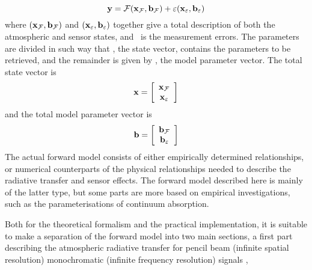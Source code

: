  \begin{equation}
   \mathbf{y} = \mathcal{F}(\mathbf{x}_{\mathcal{F}},\mathbf{b}_{\mathcal{F}}) + \varepsilon(\mathbf{x}_{\varepsilon},\mathbf{b}_{\varepsilon})
  \label{eq:formalism:fm}
 \end{equation}
 where $(\mathbf{x}_{\mathcal{F}},\mathbf{b}_{\mathcal{F}})$ and $(\mathbf{x}_{\varepsilon},\mathbf{b}_{\varepsilon})$ together give a
 total description of both the atmospheric and sensor states, and
 \merr\ is the measurement errors. The parameters are divided in such
 way that \xt, the state vector, contains the parameters to be
 retrieved, and the remainder is given by \bt, the model parameter
 vector. The total state vector is
 \begin{equation}
   \mathbf{x} = \left[ \begin{array}{c} \mathbf{x}_{\mathcal{F}} \\ \mathbf{x}_{\varepsilon} \end{array} \right]
 \end{equation}
 and the total model parameter vector is
 \begin{equation}
   \mathbf{b} = \left[ \begin{array}{c} \mathbf{b}_{\mathcal{F}} \\ \mathbf{b}_{\varepsilon} \end{array} \right]
 \end{equation}
 The actual forward model consists of either empirically determined
 relationships, or numerical counterparts of the physical
 relationships needed to describe the radiative transfer and sensor
 effects. The forward model described here is mainly of the latter
 type, but some parts are more based on empirical investigations, such
 as the parameterisations of continuum absorption. 
  
 Both for the theoretical formalism and the practical implementation,
 it is suitable to make a separation of the forward model into two
 main sections, a first part describing the atmospheric radiative
 transfer for pencil beam (infinite spatial resolution) monochromatic
 (infinite frequency resolution) signals \citep{eriksson:99},


